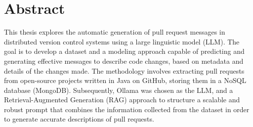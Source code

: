 \thispagestyle{plain}			%
\setlength{\parskip}{0pt plus 1.0pt}
\section*{Abstract}
This thesis explores the automatic generation of pull request messages in distributed version control systems using a large linguistic model (LLM). The goal is to develop a dataset and a modeling approach capable of predicting and generating effective messages to describe code changes, based on metadata and details of the changes made. The methodology involves extracting pull requests from open-source projects written in Java on GitHub, storing them in a NoSQL database (MongoDB). Subsequently, Ollama was chosen as the LLM, and a Retrieval-Augmented Generation (RAG) approach to structure a scalable and robust prompt that combines the information collected from the dataset in order to generate accurate descriptions of pull requests.

\vfill


\thispagestyle{empty}
\mbox{}